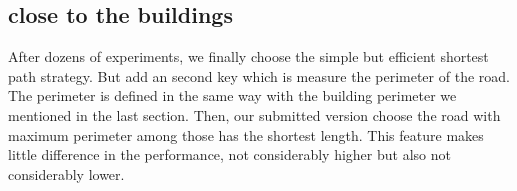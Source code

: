 \documentclass{article}
\begin{document}
\subsection{close to the buildings}
After dozens of experiments, we finally choose the simple but efficient shortest path strategy. But add an second key which is measure the perimeter of the road. The perimeter is defined in the same way with the building perimeter we mentioned in the last section. Then, our submitted version choose the road with maximum perimeter among those has the shortest length. This feature makes little difference in the performance, not considerably higher but also not considerably lower.
\end{document}
